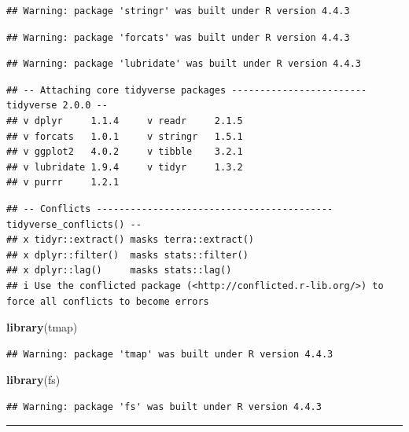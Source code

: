 \documentclass[
]{article}
\newenvironment{Shaded}{\begin{snugshade}}{\end{snugshade}}
\newcommand{\FunctionTok}[1]{\textcolor[rgb]{0.13,0.29,0.53}{\textbf{#1}}}
\newcommand{\NormalTok}[1]{#1}
\begin{document}
\begin{verbatim}
## Warning: package 'stringr' was built under R version 4.4.3
\end{verbatim}

\begin{verbatim}
## Warning: package 'forcats' was built under R version 4.4.3
\end{verbatim}

\begin{verbatim}
## Warning: package 'lubridate' was built under R version 4.4.3
\end{verbatim}

\begin{verbatim}
## -- Attaching core tidyverse packages ------------------------ tidyverse 2.0.0 --
## v dplyr     1.1.4     v readr     2.1.5
## v forcats   1.0.1     v stringr   1.5.1
## v ggplot2   4.0.2     v tibble    3.2.1
## v lubridate 1.9.4     v tidyr     1.3.2
## v purrr     1.2.1
\end{verbatim}

\begin{verbatim}
## -- Conflicts ------------------------------------------ tidyverse_conflicts() --
## x tidyr::extract() masks terra::extract()
## x dplyr::filter()  masks stats::filter()
## x dplyr::lag()     masks stats::lag()
## i Use the conflicted package (<http://conflicted.r-lib.org/>) to force all conflicts to become errors
\end{verbatim}

\begin{Shaded}
\begin{Highlighting}[]
\FunctionTok{library}\NormalTok{(tmap)}
\end{Highlighting}
\end{Shaded}

\begin{verbatim}
## Warning: package 'tmap' was built under R version 4.4.3
\end{verbatim}

\begin{Shaded}
\begin{Highlighting}[]
\FunctionTok{library}\NormalTok{(fs)}
\end{Highlighting}
\end{Shaded}

\begin{verbatim}
## Warning: package 'fs' was built under R version 4.4.3
\end{verbatim}

\begin{center}\rule{0.5\linewidth}{0.5pt}\end{center}
\end{document}
